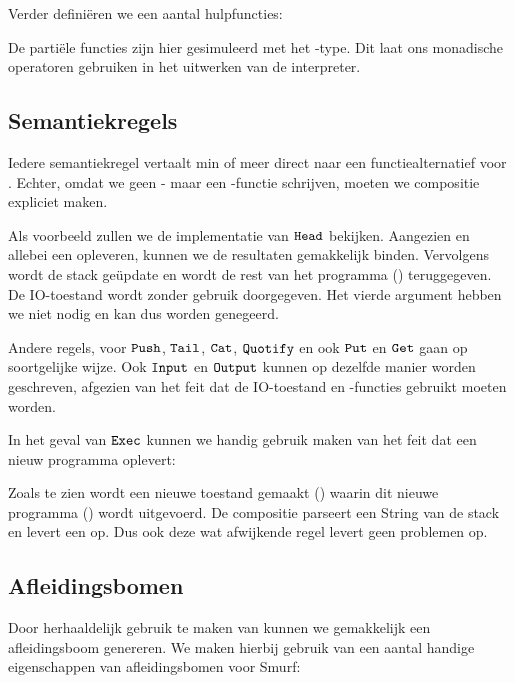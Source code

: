 \medskip
Verder definiëren we een aantal hulpfuncties:



De partiële functies zijn hier gesimuleerd met het -type. Dit laat
ons monadische operatoren gebruiken in het uitwerken van de interpreter.

\subsection{Semantiekregels}
\label{sec:cleansmurf:regels}
Iedere semantiekregel vertaalt min of meer direct naar een functiealternatief
voor . Echter, omdat we geen - maar een -functie
schrijven, moeten we compositie expliciet maken.

Als voorbeeld zullen we de implementatie van $\texttt{Head}$ bekijken. Aangezien
 en  allebei een  opleveren, kunnen we de resultaten
gemakkelijk binden. Vervolgens wordt de stack geüpdate en wordt de rest van het
programma () teruggegeven. De IO-toestand wordt zonder gebruik
doorgegeven. Het vierde argument hebben we niet nodig en kan dus worden
genegeerd.



Andere regels, voor $\texttt{Push}$, $\texttt{Tail}$, $\texttt{Cat}$, $\texttt{Quotify}$ en ook
$\texttt{Put}$ en $\texttt{Get}$ gaan op soortgelijke wijze. Ook $\texttt{Input}$ en
$\texttt{Output}$ kunnen op dezelfde manier worden geschreven, afgezien van het feit
dat de IO-toestand en -functies gebruikt moeten worden.

In het geval van $\texttt{Exec}$ kunnen we handig gebruik maken van het feit dat
 een nieuw programma oplevert:



Zoals te zien wordt een nieuwe toestand gemaakt () waarin dit nieuwe
programma () wordt uitgevoerd. De compositie 
parseert een String van de stack en levert een  op. Dus ook
deze wat afwijkende regel levert geen problemen op.

\subsection{Afleidingsbomen}
Door herhaaldelijk gebruik te maken van  kunnen we gemakkelijk een
afleidingsboom genereren. We maken hierbij gebruik van een aantal handige
eigenschappen van afleidingsbomen voor Smurf:

